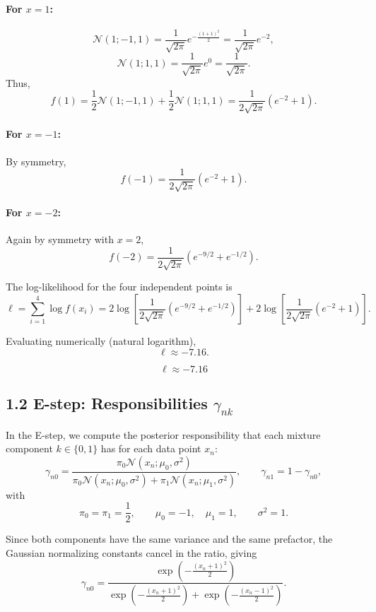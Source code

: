 \documentclass{article}
\begin{document}
\paragraph{For $x = 1$:}
\[
\mathcal{N}(1;-1,1)
= \frac{1}{\sqrt{2\pi}} e^{-\frac{(1+1)^2}{2}}
= \frac{1}{\sqrt{2\pi}} e^{-2},
\]
\[
\mathcal{N}(1;1,1)
= \frac{1}{\sqrt{2\pi}} e^{0}
= \frac{1}{\sqrt{2\pi}}.
\]
Thus,
\[
f(1)
= \frac12 \mathcal{N}(1;-1,1) + \frac12 \mathcal{N}(1;1,1)
= \frac{1}{2\sqrt{2\pi}}(e^{-2} + 1).
\]

\paragraph{For $x = -1$:}
By symmetry,
\[
f(-1) = \frac{1}{2\sqrt{2\pi}}(e^{-2} + 1).
\]

\paragraph{For $x = -2$:}
Again by symmetry with $x = 2$,
\[
f(-2) = \frac{1}{2\sqrt{2\pi}}\left( e^{-9/2} + e^{-1/2} \right).
\]

\bigskip

The log-likelihood for the four independent points is
\[
\ell
= \sum_{i=1}^4 \log f(x_i)
= 2\log\!\left[\frac{1}{2\sqrt{2\pi}}(e^{-9/2}+e^{-1/2})\right]
+ 2\log\!\left[\frac{1}{2\sqrt{2\pi}}(e^{-2}+1)\right].
\]

Evaluating numerically (natural logarithm),
\[
\ell \approx -7.16.
\]

\[
\boxed{\ell \approx -7.16}
\]

\subsection*{1.2 E-step: Responsibilities $\gamma_{nk}$}

In the E-step, we compute the posterior responsibility that each mixture component $k \in \{0,1\}$ has for each data point $x_n$:
\[
\gamma_{n0} = 
\frac{\pi_0 \mathcal{N}(x_n;\mu_0,\sigma^2)}
     {\pi_0 \mathcal{N}(x_n;\mu_0,\sigma^2)
     + \pi_1 \mathcal{N}(x_n;\mu_1,\sigma^2)},
\qquad
\gamma_{n1} = 1 - \gamma_{n0},
\]
with
\[
\pi_0 = \pi_1 = \frac12, \qquad
\mu_0 = -1,\quad \mu_1 = 1,\qquad
\sigma^2 = 1.
\]

Since both components have the same variance and the same prefactor, the Gaussian normalizing constants cancel in the ratio, giving
\[
\gamma_{n0}
= \frac{\exp\!\left(-\frac{(x_n+1)^2}{2}\right)}
       {\exp\!\left(-\frac{(x_n+1)^2}{2}\right)
       + \exp\!\left(-\frac{(x_n-1)^2}{2}\right)}.
\]
\end{document}
